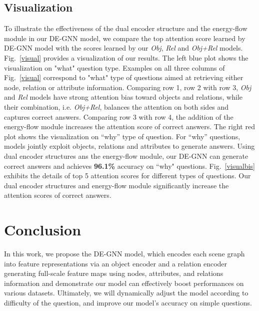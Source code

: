 \documentclass[letterpaper]{article} %
\begin{document}
\subsection{Visualization}
To illustrate the effectiveness of the dual encoder structure and the energy-flow module in our DE-GNN model, we compare the top attention score learned by DE-GNN model with the scores learned by our \emph{Obj}, \emph{Rel} and \emph{Obj+Rel} models. 
Fig.~\ref{visual} provides a visualization of our results.
The left blue plot shows the visualization on "what" question type. 
Examples on all three columns of Fig.~\ref{visual} correspond to "what" type of questions aimed at retrieving either node, relation or attribute information. 
Comparing row 1, row 2 with row 3, \emph{Obj} and \emph{Rel} models have strong attention bias toward objects and relations, while their combination, i.e. \emph{Obj+Rel}, balances the attention on both sides and captures correct answers. 
Comparing row 3 with row 4, the addition of the energy-flow module increases the attention score of correct answers. 
The right red plot shows the visualization on ``why'' type of question. 
For ``why'' questions, models jointly exploit objects, relations and attributes to generate answers. 
Using dual encoder structures ans the energy-flow module, our DE-GNN can generate correct answers and achieves \textbf{96.1\%} accuracy on ``why" questions.
Fig.~\ref{visualbis} exhibits the details of top 5 attention scores for different types of questions. 
Our dual encoder structures and energy-flow module significantly increase the attention scores of correct answers.


\section{Conclusion}
In this work, 
we propose the DE-GNN model, which encodes each scene graph into feature representations via an object encoder and a relation encoder generating full-scale feature maps using nodes, attributes, and relations information and demonstrate our model can effectively boost performances on various datasets. 
Ultimately, we will dynamically adjust the model according to difficulty of the question, and improve our model's accuracy on simple questions.


\newpage


\clearpage

\end{document}
